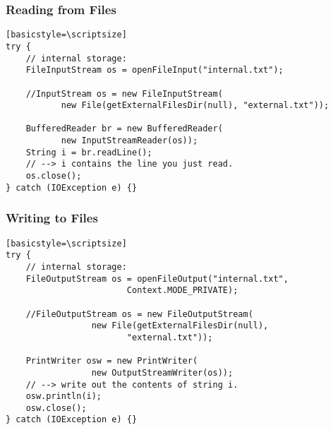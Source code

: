 \begin{frame}[fragile]
\frametitle{Reading from Files}
\begin{changemargin}{0.1cm}

\begin{verbatim}[basicstyle=\scriptsize]
try {
    // internal storage: 
    FileInputStream os = openFileInput("internal.txt");
    
    //InputStream os = new FileInputStream(
           new File(getExternalFilesDir(null), "external.txt"));
           
    BufferedReader br = new BufferedReader(
           new InputStreamReader(os));
    String i = br.readLine();
    // --> i contains the line you just read.
    os.close();
} catch (IOException e) {}
\end{verbatim}

\end{changemargin}
\end{frame}


\begin{frame}[fragile]
\frametitle{Writing to Files}
\begin{changemargin}{1cm}

\begin{verbatim}[basicstyle=\scriptsize]
try {
    // internal storage:
    FileOutputStream os = openFileOutput("internal.txt", 
                        Context.MODE_PRIVATE);
                        
    //FileOutputStream os = new FileOutputStream(
                 new File(getExternalFilesDir(null), 
                        "external.txt"));

    PrintWriter osw = new PrintWriter(
                 new OutputStreamWriter(os));
    // --> write out the contents of string i.
    osw.println(i);
    osw.close();
} catch (IOException e) {}
\end{verbatim}


\end{changemargin}
\end{frame}

